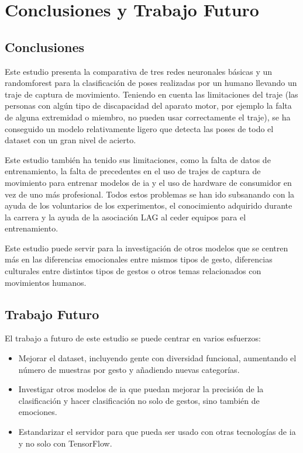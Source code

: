 \chapter{Conclusiones y Trabajo Futuro}
\label{cap:conclusiones}

\section{Conclusiones}

Este estudio presenta la comparativa de tres redes neuronales básicas y un \gls{randomforest} para la clasificación de poses realizadas por un humano llevando un traje de captura de movimiento. Teniendo en cuenta las limitaciones del traje (las personas con algún tipo de discapacidad del aparato motor, por ejemplo la falta de alguna extremidad o miembro, no pueden usar correctamente el traje), se ha conseguido un modelo relativamente ligero que detecta las poses de todo el dataset con un gran nivel de acierto.

Este estudio también ha tenido sus limitaciones, como la falta de datos de entrenamiento, la falta de precedentes en el uso de trajes de captura de movimiento para entrenar modelos de \gls{ia} y el uso de hardware de consumidor en vez de uno más profesional. Todos estos problemas se han ido subsanando con la ayuda de los voluntarios de los experimentos, el conocimiento adquirido durante la carrera y la ayuda de la asociación LAG al ceder equipos para el entrenamiento.

Este estudio puede servir para la investigación de otros modelos que se centren más en las diferencias emocionales entre mismos tipos de gesto, diferencias culturales entre distintos tipos de gestos o otros temas relacionados con movimientos humanos.



\section{Trabajo Futuro}

El trabajo a futuro de este estudio se puede centrar en varios esfuerzos:
\begin{itemize}
    \item Mejorar el dataset, incluyendo gente con diversidad funcional, aumentando el número de muestras por gesto y añadiendo nuevas categorías.
    \item Investigar otros modelos de \gls{ia} que puedan mejorar la precisión de la clasificación y hacer clasificación no solo de gestos, sino también de emociones.
    \item Estandarizar el servidor para que pueda ser usado con otras tecnologías de \gls{ia} y no solo con TensorFlow.
\end{itemize}



